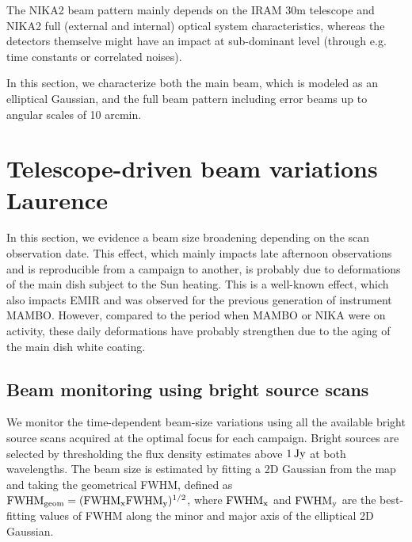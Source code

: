 

The NIKA2 beam pattern mainly depends on the IRAM 30m telescope and
NIKA2 full (external and internal) optical system characteristics,
whereas the detectors themselve might have an impact at sub-dominant
level (through e.g. time constants or correlated noises).

In this section, we characterize both the main beam, which is
modeled as an elliptical Gaussian, and the full beam pattern including
error beams up to angular scales of 10 arcmin.

\section{Telescope-driven beam variations {\color{blue} Laurence}}
\label{se:obsdate_variations}

In this section, we evidence a beam size broadening depending on the
scan observation date. This effect, which mainly impacts late
afternoon observations and is reproducible from a campaign to another,
is probably due to deformations of the main dish subject to the Sun
heating. This is a well-known effect, which also impacts EMIR and was
observed for the previous generation of instrument MAMBO. However,
compared to the period when MAMBO or NIKA were on activity, these
daily deformations have probably strengthen due to the aging of the
main dish white coating.

\subsection{Beam monitoring using bright source scans}

We monitor the time-dependent beam-size variations using all the
available bright source scans acquired at the optimal focus for each
campaign. Bright sources are selected by thresholding the flux density
estimates above $1\,\rm{Jy}$ at both wavelengths.
The beam size is estimated by fitting a 2D Gaussian from the map and
taking the geometrical FWHM, defined as 
$\rm{FWHM}_{\rm{geom}} = (\rm{FWHM}_x \rm{FWHM}_y)^{1/2}$, where
$\rm{FWHM}_x$ and $\rm{FWHM}_y$ are the best-fitting values of FWHM
along the minor and major axis of the elliptical 2D Gaussian.


